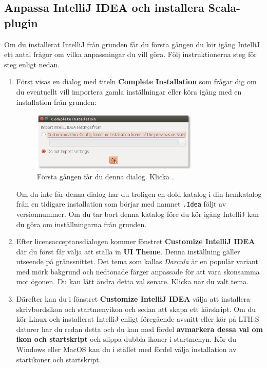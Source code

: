 \subsection{Anpassa IntelliJ IDEA och installera Scala-plugin}\label{appendix:ide:intellij:tweak}
Om du installerat IntelliJ från grunden får du första gången du kör igång IntelliJ ett antal frågor om vilka anpassningar du vill göra. Följ instruktionerna steg för steg enligt nedan.
\begin{enumerate}

\item Först visas en dialog med titeln \textbf{Complete Installation} som frågar dig om du eventuellt vill importera gamla inställningar eller köra igång med en installation från grunden:
\begin{figure}%
\centering
\includegraphics[width=0.75\textwidth]{../img/intellij/idea1-complete-installation.png}
\caption {Första gången får du denna dialog. Klicka .}
\label{fig:eclipse:import-projects}
\end{figure}
Om du inte får denna dialog har du troligen en dold katalog i din hemkatalog från en tidigare installation som börjar med namnet \texttt{.Idea} följt av versionnummer. Om du tar bort denna katalog före du kör igång IntelliJ kan du göra om inställningarna från grunden.

\item Efter licensacceptansdialogen kommer fönstret \textbf{Customize IntelliJ IDEA} där du först får välja att ställa in \textbf{UI Theme}. Denna inställning gäller utseende på gränssnittet. Det tema som kallas \textit{Darcula} är en populär variant med mörk bakgrund och nedtonade färger anpassade för att vara skonsamma mot ögonen. Du kan lätt ändra detta val senare. Klicka  när du valt tema.

\item Därefter kan du i fönstret \textbf{Customize IntelliJ IDEA} välja att installera skrivbordsikon och startmenyikon och sedan att skapa ett körskript. Om du kör Linux och installerat IntelliJ enligt föregående avsnitt eller kör på LTH:S datorer har du redan detta och du kan med fördel \textbf{avmarkera dessa val om ikon och startskript} och slippa dubbla ikoner i startmenyn. Kör du Windows eller MacOS kan du i stället med fördel välja installation av startikoner och startskript.


\end{enumerate}
